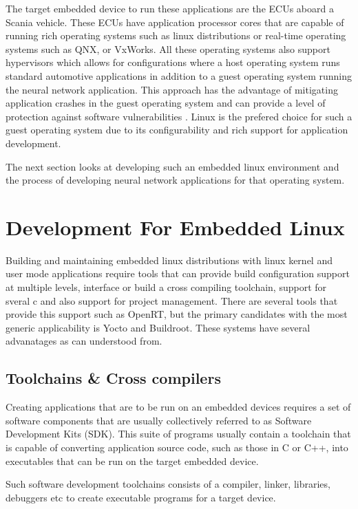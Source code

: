 The target embedded device to run these applications are the ECUs aboard a Scania vehicle. These ECUs have application processor cores that are capable of running rich operating systems such as linux distributions or real-time operating systems such as QNX, or VxWorks. All these operating systems also support hypervisors which allows for configurations where a host operating system runs standard automotive applications in addition to a guest operating system running the neural network application. This approach has the advantage of mitigating application crashes in the guest operating system and can provide a level of protection against software vulnerabilities \cite{linux-guest-os}. Linux is the prefered choice for such a guest operating system due to its configurability and rich support for application development.

The next section looks at developing such an embedded linux environment and the process of developing neural network applications for that operating system.

\section[Development Process for Embedded Linux]{Development For Embedded Linux}

Building and maintaining embedded linux distributions with linux kernel and user mode applications require tools that can provide build configuration support at multiple levels, interface or build a cross compiling toolchain, support for sveral c and also support for project management. There are several tools that provide this support such as OpenRT, but the primary candidates with the most generic applicability is Yocto and Buildroot. These systems have several advanatages as can understood from.

\subsection[SDKs \& Compiler Toolchains]{Toolchains \& Cross compilers}

Creating applications that are to be run on an embedded devices requires a set of software components that are usually collectively referred to as Software Development Kits (SDK). This suite of programs usually contain a toolchain that is capable of converting application source code, such as those in C or C++, into executables that can be run on the target embedded device.

Such software development toolchains consists of a compiler, linker, libraries, debuggers etc to create executable programs for a target device.

